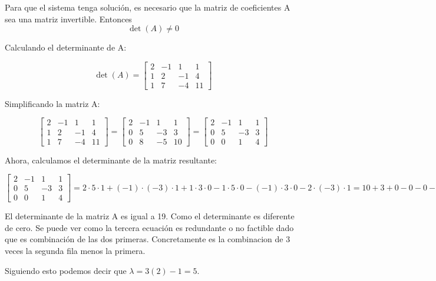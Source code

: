 Para que el sistema tenga solución, es necesario que la matriz de coeficientes A sea una matriz invertible.
Entonces
\[ \det(A) \neq 0 \]


Calculando el determinante de A:

\[ \det(A) = \begin{bmatrix} 
2 & -1 & 1 & 1 \\
1 & 2 & -1 & 4 \\
1 & 7 & -4 & 11
\end{bmatrix} \]

Simplificando la matriz A:

\[ \begin{bmatrix} 
2 & -1 & 1 & 1 \\
1 & 2 & -1 & 4 \\
1 & 7 & -4 & 11
\end{bmatrix} 
= \begin{bmatrix} 
2 & -1 & 1 & 1 \\
0 & 5 & -3 & 3 \\
0 & 8 & -5 & 10
\end{bmatrix} 
= \begin{bmatrix} 
2 & -1 & 1 & 1 \\
0 & 5 & -3 & 3 \\
0 & 0 & 1 & 4
\end{bmatrix} \]

Ahora, calculamos el determinante de la matriz resultante:

\[ \begin{bmatrix} 
2 & -1 & 1 & 1 \\
0 & 5 & -3 & 3 \\
0 & 0 & 1 & 4
\end{bmatrix} 
= 2 \cdot 5 \cdot 1 + (-1) \cdot (-3) \cdot 1 + 1 \cdot 3 \cdot 0 - 1 \cdot 5 \cdot 0 - (-1) \cdot 3 \cdot 0 - 2 \cdot (-3) \cdot 1
= 10 + 3 + 0 - 0 - 0 - (-6)
= 19 \]


El determinante de la matriz A es igual a 19. Como el determinante es diferente de cero.
Se puede ver como la tercera ecuación es redundante o no factible dado que es combinación de las dos primeras.
Concretamente es la combinacion de 3 veces la segunda fila menos la primera.

Siguiendo esto podemos decir que $\lambda=3(2)-1=5$.

